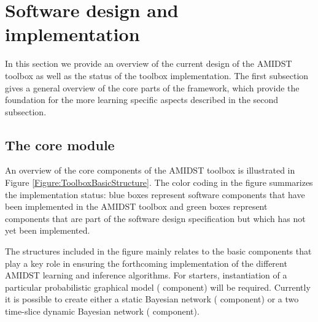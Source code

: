 \section{Software design and implementation}\label{sec:design}

In this section we provide an overview of the current design of the AMIDST toolbox as well as the status of the
toolbox implementation. The first subsection gives a general overview of the core parts of the framework,
which provide the foundation for the more learning specific aspects described in the second subsection.    

\subsection{The core module}
\label{sec:core-module}

An overview of the core components of the AMIDST toolbox is illustrated in Figure
\ref{Figure:ToolboxBasicStructure}. The color coding in the figure summarizes the implementation status: blue boxes represent
software components that have been implemented in the AMIDST toolbox and green boxes represent components
that are part of the software design specification but which has not yet been implemented.      

The structures included in the figure
mainly relates to the basic components that play a key role in ensuring the
forthcoming implementation of the different AMIDST learning and inference algorithms. For starters, instantiation of a particular probabilistic graphical model ( component) will be required. Currently it is possible to create either a static Bayesian network ( component) or a two time-slice dynamic Bayesian network ( component).

